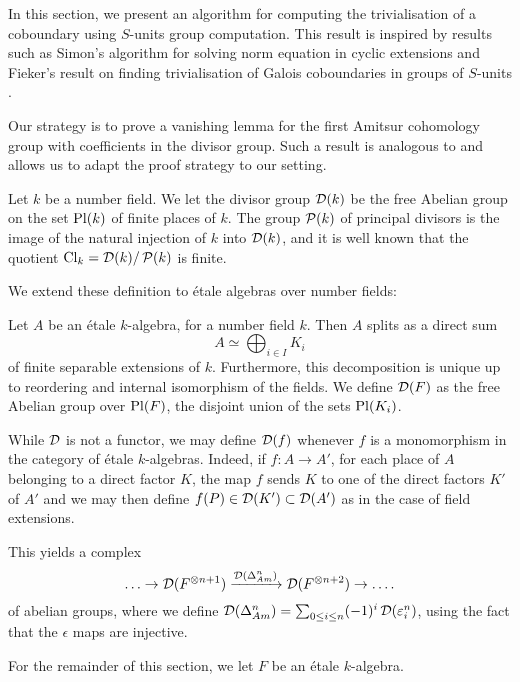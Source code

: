 In this section, we present an algorithm for computing the trivialisation of a coboundary using \(S\)-units group computation. This result is inspired by results such as Simon's algorithm for solving norm equation in cyclic extensions \cite{simon2002solving} and Fieker's result on finding trivialisation of Galois coboundaries in groups of \(S\)-units \cite[Theorem 7]{fieker2009minimizing}.

Our strategy is to prove a vanishing lemma for the first Amitsur cohomology group with coefficients in the divisor group. Such a result is analogous to \cite[Lemma 7]{fieker2009minimizing} and allows us to adapt the proof strategy to our setting.

Let \(k\) be a number field. We let the divisor group \(\operatorname{\mathcal{D}}(k)\) be the free Abelian group on the set \(\operatorname{Pl}(k)\) of finite places of \(k\). The group \(\operatorname{\mathcal{P}}(k)\) of principal divisors is the image of the natural injection of \(k\) into \(\operatorname{\mathcal{D}}(k)\), and it is well known that the quotient \(\operatorname{Cl}_k = \operatorname{\mathcal{D}}(k)/\operatorname{\mathcal{P}}(k)\) is finite.

We extend these definition to étale algebras over number fields:
\begin{definition}\label{def:EtaleDivisors}
    Let \(A\) be an étale \(k\)-algebra, for a number field \(k\). Then \(A\) splits as a direct sum
    \[A \simeq \bigoplus_{i \in I} K_i\]
    of finite separable extensions of \(k\). Furthermore, this decomposition is unique up to reordering and internal isomorphism of the fields. We define \(\operatorname{\mathcal{D}}(F)\) as the free Abelian group over \(\operatorname{Pl}(F)\), the disjoint union of the sets \(\operatorname{Pl}(K_i)\).
\end{definition}

    While \(\operatorname{\mathcal{D}}\) is not a functor, we may define \(\operatorname{\mathcal{D}}(f)\) whenever \(f\) is a monomorphism in the category of étale \(k\)-algebras. Indeed, if \(f\colon A \to A'\), for each place of \(A\) belonging to a direct factor \(K\), the map \(f\) sends \(K\) to one of the direct factors \(K'\) of \(A'\) and we may then define \(f(P) \in \operatorname{\mathcal{D}}(K') \subset \operatorname{\mathcal{D}}(A')\) as in the case of field extensions.
    
    This yields a complex
    \[\hdots \to \operatorname{\mathcal{D}}(F^{\otimes n+1}) \xrightarrow{\operatorname{\mathcal{D}}(\Delta_{Am}^{n})} \operatorname{\mathcal{D}}(F^{\otimes n+2}) \to \hdots.\]
of abelian groups, where we define \(\operatorname{\mathcal{D}}(\Delta_{Am}^n) = \sum_{0 \leq i \leq n} (-1)^i \operatorname{\mathcal{D}}(\varepsilon^n_i)\), using the fact that the \(\epsilon\) maps are injective.

For the remainder of this section, we let \(F\) be an étale \(k\)-algebra.

